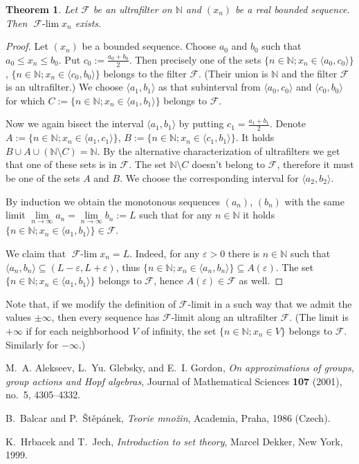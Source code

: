 \documentclass[12pt]{article}
\newcommand{\N}[0]{\mathbb{N}}
\newcommand{\intrv}[2]{\langle #1,#2 \rangle}
\newcommand{\ve}{\varepsilon}
\newcommand{\limti}[1]{\lim\limits_{#1\to\infty}}
\newcommand{\mc}{\mathcal}
\newtheorem{THM}{Theorem}
\newcommand{\F}{\mc F}
\newcommand{\Flim}{\operatorname{\F\text{-}\lim}}
\begin{document}
\begin{THM}
Let $\F$ be an ultrafilter on $\N$ and $(x_n)$ be a real bounded
sequence. Then $\Flim x_n$ exists.
\end{THM}

\begin{proof}
Let $(x_n)$ be a bounded sequence. Choose $a_0$ and $b_0$ such
that $a_0\leq x_n \leq b_0$. Put $c_0:=\frac{a_0+b_0}2$. Then
precisely one of the sets $\{n\in\N; x_n \in \intrv{a_0}{c_0}\}$,
$\{n\in\N; x_n \in \intrv{c_0}{b_0}\}$ belongs to the filter $\F$.
(Their union is $\N$ and the filter $\F$ is an ultrafilter.) We
choose $\intrv{a_1}{b_1}$ as that subinterval from
$\intrv{a_0}{c_0}$ and $\intrv{c_0}{b_0}$ for which $C:=\{n\in\N;
x_n \in \intrv{a_1}{b_1}\}$ belongs to $\F$.

Now we again bisect the interval $\intrv{a_1}{b_1}$ by putting
$c_1=\frac{a_1+b_1}2$. Denote $A:=\{n\in\N; x_n \in
\intrv{a_1}{c_1}\}$, $B:=\{n\in\N; x_n \in \intrv{c_1}{b_1}\}$. It
holds $B\cup A\cup (\N\setminus C)=\N$. By the alternative
characterization of ultrafilters we get that one of these sets is
in $\F$. The set $\N\setminus C$ doesn't belong to $\F$, therefore
it must be one of the sets $A$ and $B$. We choose the
corresponding interval for $\intrv{a_2}{b_2}$.

By induction we obtain the monotonous sequences $(a_n)$, $(b_n)$
with the same limit $\limti n a_n = \limti n b_n :=L$ such that
for any $n\in\N$ it holds $\{n\in\N; x_n \in
\intrv{a_1}{b_1}\}\in\F$.

We claim that $\Flim x_n=L$. Indeed, for any $\ve>0$ there is
$n\in\N$ such that $\intrv{a_n}{b_n}\subseteq (L-\ve,L+\ve)$, thus
$\{n\in\N; x_n \in \intrv{a_n}{b_n}\} \subseteq A(\ve)$. The set
$\{n\in\N; x_n \in \intrv{a_1}{b_1}\}$ belongs to $\F$, hence
$A(\ve)\in\F$ as well.
\end{proof}

Note that, if we modify the definition of $\F$-limit in a such way
that we admit the values $\pm\infty$, then every sequence has
$\F$-limit along an ultrafilter $\F$. (The limit is $+\infty$ if
for each neighborhood $V$ of infinity, the set $\{n\in\N; x_n\in
V\}$ belongs to $\F$. Similarly for $-\infty$.)

\begin{thebibliography}{1}

M.~A. Alekseev, L.~{Yu.} Glebsky, and E.~I. Gordon, \emph{On
approximations of
  groups, group actions {and Hopf} algebras}, Journal of Mathematical Sciences
  \textbf{107} (2001), no.~5, 4305--4332.

B.~Balcar and P.~{\v{S}}t\v{e}p\'anek, \emph{Teorie mno\v{z}in},
Academia,
  Praha, 1986 (Czech).

K.~Hrbacek and T.~Jech, \emph{{Introduction to set theory}},
{Marcel Dekker},
  New York, 1999.

\end{thebibliography}
\end{document}

